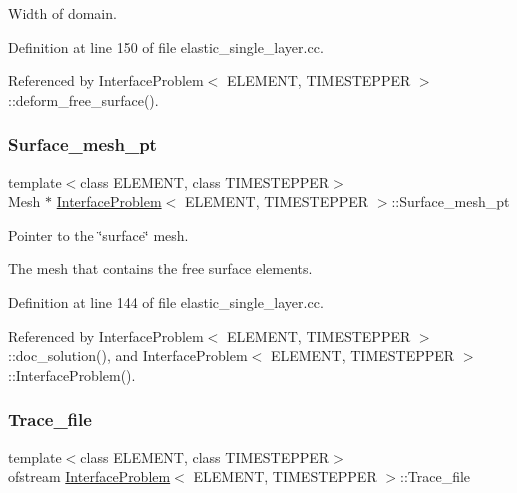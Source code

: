 Width of domain. 



Definition at line 150 of file elastic\+\_\+single\+\_\+layer.\+cc.



Referenced by Interface\+Problem$<$ E\+L\+E\+M\+E\+N\+T, T\+I\+M\+E\+S\+T\+E\+P\+P\+E\+R $>$\+::deform\+\_\+free\+\_\+surface().

\mbox{\label{classInterfaceProblem_a011c7b4f2307ff909f64dc158e8fc674}} 
\subsubsection{\texorpdfstring{Surface\+\_\+mesh\+\_\+pt}{Surface\_mesh\_pt}}
{\footnotesize\ttfamily template$<$class E\+L\+E\+M\+E\+NT, class T\+I\+M\+E\+S\+T\+E\+P\+P\+ER$>$ \\
Mesh $\ast$ \hyperlink{classInterfaceProblem}{Interface\+Problem}$<$ E\+L\+E\+M\+E\+NT, T\+I\+M\+E\+S\+T\+E\+P\+P\+ER $>$\+::Surface\+\_\+mesh\+\_\+pt\hspace{0.3cm}{\ttfamily [private]}}



Pointer to the \char`\"{}surface\char`\"{} mesh. 

The mesh that contains the free surface elements. 

Definition at line 144 of file elastic\+\_\+single\+\_\+layer.\+cc.



Referenced by Interface\+Problem$<$ E\+L\+E\+M\+E\+N\+T, T\+I\+M\+E\+S\+T\+E\+P\+P\+E\+R $>$\+::doc\+\_\+solution(), and Interface\+Problem$<$ E\+L\+E\+M\+E\+N\+T, T\+I\+M\+E\+S\+T\+E\+P\+P\+E\+R $>$\+::\+Interface\+Problem().

\mbox{\label{classInterfaceProblem_a45e3bf3b44bcbeefab21a3598bef6179}} 
\subsubsection{\texorpdfstring{Trace\+\_\+file}{Trace\_file}}
{\footnotesize\ttfamily template$<$class E\+L\+E\+M\+E\+NT, class T\+I\+M\+E\+S\+T\+E\+P\+P\+ER$>$ \\
ofstream \hyperlink{classInterfaceProblem}{Interface\+Problem}$<$ E\+L\+E\+M\+E\+NT, T\+I\+M\+E\+S\+T\+E\+P\+P\+ER $>$\+::Trace\+\_\+file\hspace{0.3cm}{\ttfamily [private]}}



